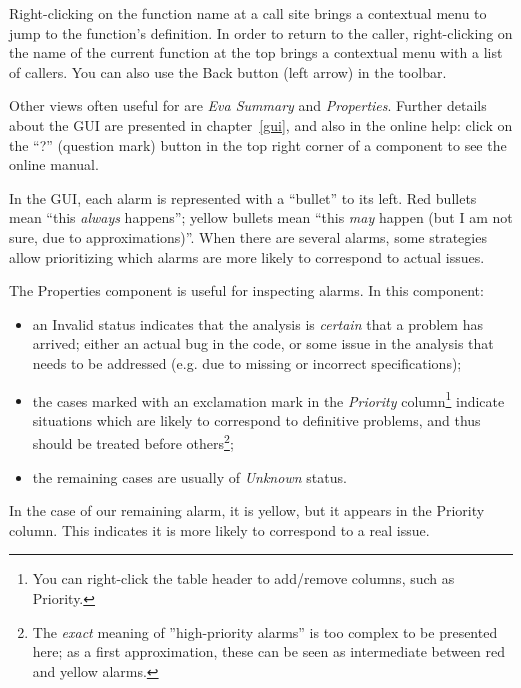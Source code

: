 \documentclass{frama-c-book}
\begin{document}
Right-clicking on the function name
at a call site brings a contextual menu to jump
to the function's definition.
In order to return to the caller,
right-clicking on the name of the current function at the top
brings a contextual menu with a list of callers.
You can also use the Back button (left arrow) in the toolbar.

Other views often useful for \Eva{} are {\em Eva Summary} and
{\em Properties}. Further details about the GUI are presented in
chapter~\ref{gui}, and also in the online help: click on the ``?''
(question mark) button in the top right corner of a component to
see the online manual.

In the GUI, each alarm is represented with a ``bullet'' to its left.
Red bullets mean ``this {\em always} happens''; yellow
bullets mean ``this {\em may} happen (but I am not sure, due to
approximations)''. When there are several alarms, some strategies allow
prioritizing which alarms are more likely to correspond to actual issues.

The Properties component is useful for inspecting alarms. In this component:

\begin{itemize}
\item an Invalid status indicates that the
  analysis is {\em certain} that a problem has arrived;
  either an actual bug in the code, or some issue in the analysis that needs to
  be addressed (e.g. due to missing or incorrect specifications);
\item the cases marked with an exclamation mark in the {\em Priority}
  column\footnote{You can right-click the table header to add/remove columns,
  such as Priority.} indicate situations
  which are likely to correspond to definitive problems, and thus should be
  treated before others\footnote{The {\em exact} meaning of
  ''high-priority alarms'' is
  too complex to be presented here; as a first approximation, these can be
  seen as intermediate between red and yellow alarms.};
\item the remaining cases are usually of {\em Unknown} status.
\end{itemize}

In the case of our remaining alarm, it is yellow, but it appears in the
Priority column. This indicates it is more likely to correspond to a real
issue.
\end{document}
